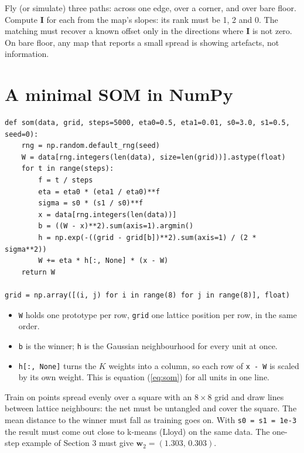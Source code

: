 \documentclass[11pt,a4paper]{article}
\newcommand{\vect}[1]{\mathbf{#1}}
\newcommand{\w}{\vect{w}}
\begin{document}
\begin{testbox}
Fly (or simulate) three paths: across one edge, over a corner, and over bare floor. Compute $\vect{I}$ for each
from the map's slopes: its rank must be 1, 2 and 0. The matching must recover a known offset only in the directions
where $\vect{I}$ is not zero. On bare floor, any map that reports a small spread is showing artefacts, not
information.
\end{testbox}

\section{A minimal SOM in NumPy}
{\small
\begin{verbatim}
def som(data, grid, steps=5000, eta0=0.5, eta1=0.01, s0=3.0, s1=0.5, seed=0):
    rng = np.random.default_rng(seed)
    W = data[rng.integers(len(data), size=len(grid))].astype(float)
    for t in range(steps):
        f = t / steps
        eta = eta0 * (eta1 / eta0)**f
        sigma = s0 * (s1 / s0)**f
        x = data[rng.integers(len(data))]
        b = ((W - x)**2).sum(axis=1).argmin()
        h = np.exp(-((grid - grid[b])**2).sum(axis=1) / (2 * sigma**2))
        W += eta * h[:, None] * (x - W)
    return W

grid = np.array([(i, j) for i in range(8) for j in range(8)], float)
\end{verbatim}
}
\begin{itemize}[leftmargin=*]
\item \texttt{W} holds one prototype per row, \texttt{grid} one lattice position per row, in the same order.
\item \texttt{b} is the winner; \texttt{h} is the Gaussian neighbourhood for every unit at once.
\item \texttt{h[:, None]} turns the $K$ weights into a column, so each row of \texttt{x - W} is scaled by its own
weight. This is equation (\ref{eq:som}) for all units in one line.
\end{itemize}

\begin{testbox}
Train on points spread evenly over a square with an $8\times8$ grid and draw lines between lattice neighbours: the
net must be untangled and cover the square. The mean distance to the winner must fall as training goes on. With
\texttt{s0 = s1 = 1e-3} the result must come out close to k-means (Lloyd) on the same data. The one-step example of Section 3
must give $\w_2=(1.303,\,0.303)$.
\end{testbox}
\end{document}
